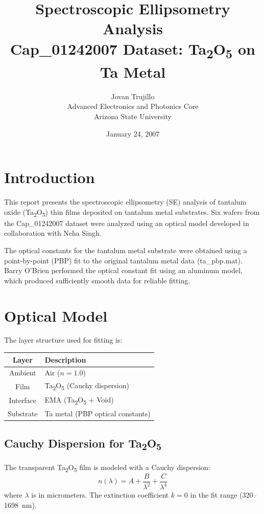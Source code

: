\documentclass[11pt]{article}
\title{Spectroscopic Ellipsometry Analysis\\
Cap\_01242007 Dataset: Ta\textsubscript{2}O\textsubscript{5} on Ta Metal}
\author{Jovan Trujillo\\
Advanced Electronics and Photonics Core\\
Arizona State University}
\date{January 24, 2007}
\begin{document}
\maketitle

\section{Introduction}

This report presents the spectroscopic ellipsometry (SE) analysis of tantalum oxide
(Ta\textsubscript{2}O\textsubscript{5}) thin films deposited on tantalum metal substrates.
Six wafers from the Cap\_01242007 dataset were analyzed using an optical model developed
in collaboration with Neha Singh.

The optical constants for the tantalum metal substrate were obtained using a point-by-point
(PBP) fit to the original tantalum metal data (ta\_pbp.mat). Barry O'Brien performed
the optical constant fit using an aluminum model, which produced sufficiently smooth
data for reliable fitting.

\section{Optical Model}

The layer structure used for fitting is:

\begin{center}
\begin{tabular}{cl}
\toprule
Layer & Description \\
\midrule
Ambient & Air ($n = 1.0$) \\
Film & Ta\textsubscript{2}O\textsubscript{5} (Cauchy dispersion) \\
Interface & EMA (Ta\textsubscript{2}O\textsubscript{5} + Void) \\
Substrate & Ta metal (PBP optical constants) \\
\bottomrule
\end{tabular}
\end{center}

\subsection{Cauchy Dispersion for Ta\textsubscript{2}O\textsubscript{5}}

The transparent Ta\textsubscript{2}O\textsubscript{5} film is modeled with a Cauchy dispersion:
\begin{equation}
n(\lambda) = A + \frac{B}{\lambda^2} + \frac{C}{\lambda^4}
\end{equation}
where $\lambda$ is in micrometers. The extinction coefficient $k = 0$ in the fit range
(\SI{320}{}--\SI{1698}{nm}).
\end{document}
